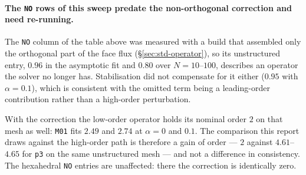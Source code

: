 \documentclass[11pt,a4paper]{article}
\newcommand{\code}[1]{\texttt{\small #1}}
\begin{document}
\paragraph{The \code{NO} rows of this sweep predate the non-orthogonal
correction and need re-running.}
The \code{NO} column of the table above was measured with a build that assembled
only the orthogonal part of the face flux (\S\ref{sec:std-operator}), so its
unstructured entry, $0.96$ in the asymptotic fit and $0.80$ over $N=10$--$100$,
describes an operator the solver no longer has. Stabilisation did not compensate
for it either ($0.95$ with $\alpha=0.1$), which is consistent with the omitted term
being a leading-order contribution rather than a high-order perturbation.

With the correction the low-order operator holds its nominal order $2$ on that
mesh as well: \code{M01} fits $2.49$ and $2.74$ at $\alpha=0$ and $0.1$. The
comparison this report draws against the high-order path is therefore a gain of
order --- $2$ against $4.61$--$4.65$ for \code{p3} on the same unstructured mesh ---
and not a difference in consistency. The hexahedral \code{NO} entries are
unaffected: there the correction is identically zero.
\end{document}
